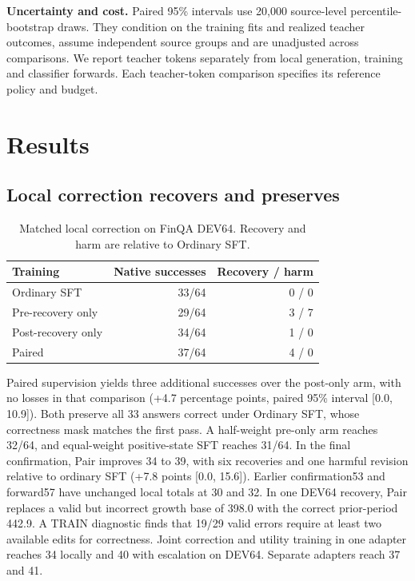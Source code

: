 \documentclass[10pt,letterpaper,conference]{IEEEtran}
\begin{document}
\textbf{Uncertainty and cost.} Paired 95\% intervals use 20,000 source-level percentile-bootstrap draws. They condition on the training fits and realized teacher outcomes, assume independent source groups and are unadjusted across comparisons. We report teacher tokens separately from local generation, training and classifier forwards. Each teacher-token comparison specifies its reference policy and budget.

\section{Results}\label{results}

\subsection{Local correction recovers and preserves}\label{local-correction-recovers-and-preserves}

\begin{table}[!t]
\centering
\caption{Matched local correction on FinQA DEV64. Recovery and harm are relative to Ordinary SFT.}
\label{tab:1}
\begin{tabular}{@{}lrr@{}}
\toprule
Training & Native successes & Recovery / harm \\
\midrule
Ordinary SFT & 33/64 & 0 / 0 \\
Pre-recovery only & 29/64 & 3 / 7 \\
Post-recovery only & 34/64 & 1 / 0 \\
Paired & 37/64 & 4 / 0 \\
\bottomrule
\end{tabular}
\end{table}

Paired supervision yields three additional successes over the post-only arm, with no losses in that comparison (+4.7 percentage points, paired 95\% interval {[}0.0, 10.9{]}). Both preserve all 33 answers correct under Ordinary SFT, whose correctness mask matches the first pass. A half-weight pre-only arm reaches 32/64, and equal-weight positive-state SFT reaches 31/64. In the final confirmation, Pair improves 34 to 39, with six recoveries and one harmful revision relative to ordinary SFT (+7.8 points {[}0.0, 15.6{]}). Earlier confirmation53 and forward57 have unchanged local totals at 30 and 32. In one DEV64 recovery, Pair replaces a valid but incorrect growth base of 398.0 with the correct prior-period 442.9. A TRAIN diagnostic finds that 19/29 valid errors require at least two available edits for correctness. Joint correction and utility training in one adapter reaches 34 locally and 40 with escalation on DEV64. Separate adapters reach 37 and 41.
\end{document}
